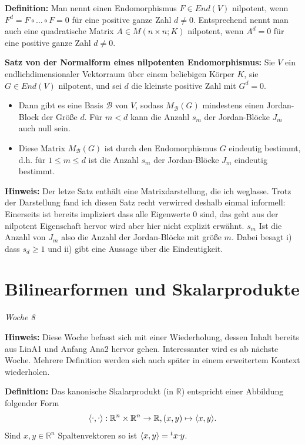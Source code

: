 \documentclass{article}
\let\oldcdot\cdot
\renewcommand{\cdot}{\raisebox{0.1ex}{$\oldcdot$}}
\begin{document}
\textbf{Definition:} Man nennt einen Endomorphismus $F\in End(V)$ nilpotent,
wenn $F^d= F\circ\dots\circ F=0$ für eine positive ganze Zahl $d\neq0$.
Entsprechend nennt man auch eine quadratische Matrix $A\in M(n\times n;K)$
nilpotent, wenn $A^d=0$ für eine positive ganze Zahl $d\neq0$.

\textbf{Satz von der Normalform eines nilpotenten Endomorphismus:} Sie $V$ ein
endlichdimensionaler Vektorraum über einem beliebigen Körper $K$, sie $G\in
End(V)$ nilpotent, und sei $d$ die kleinste positive Zahl mit $G^d=0$.

\begin{itemize}
\item[i)] Dann gibt es eine Basis $\mathcal{B}$ von $V$, sodass
	$M_\mathcal{B}(G)$ mindestens einen Jordan-Block der Größe $d$. Für
	$m<d$ kann die Anzahl $s_m$ der Jordan-Blöcke $J_m$ auch null sein.
\item[ii)] Diese Matrix $M_\mathcal{B}(G)$ ist durch den Endomorphismus $G$
	eindeutig bestimmt, d.h. für $1\leq m \leq d$ ist die Anzahl $s_m$ der
	Jordan-Blöcke $J_m$ eindeutig bestimmt.
\end{itemize}

\textbf{Hinweis:} Der letze Satz enthält eine Matrixdarstellung,
die ich weglasse. Trotz der Darstellung fand ich diesen Satz recht verwirred
deshalb einmal informell: Einerseits ist bereits impliziert dass alle
Eigenwerte $0$ sind, das geht aus der nilpotent Eigenschaft hervor wird aber
hier nicht explizit erwähnt. $s_m$ Ist die Anzahl von $J_m$ also die Anzahl der
Jordan-Blöcke mit größe $m$. Dabei besagt i) dass $s_d\geq 1$ und ii) gibt eine
Aussage über die Eindeutigkeit.

\section{Bilinearformen und Skalarprodukte}

\textit{\small \hspace{-1.5cm}Woche 8}

\textbf{Hinweis:} Diese Woche befasst sich mit einer Wiederholung, dessen
Inhalt bereits aus LinA1 und Anfang Ana2 hervor gehen. Interessanter wird es ab
nächste Woche. Mehrere Definition werden sich auch später in einem erweitertem
Kontext wiederholen.

\newpage
\textbf{Definition:} Das kanonische Skalarprodukt (in $\mathbb{R}$) entspricht
einer Abbildung folgender Form 
\begin{equation*}
\langle\cdot,\cdot\rangle: \mathbb{R}^n \times
\mathbb{R}^n\to\mathbb{R}, (x,y)\mapsto\langle x,y\rangle.
\end{equation*}
Sind $x,y\in\mathbb{R}^n$ Spaltenvektoren so ist $\langle x,y\rangle = {^tx}\cdot
y$.
\end{document}
